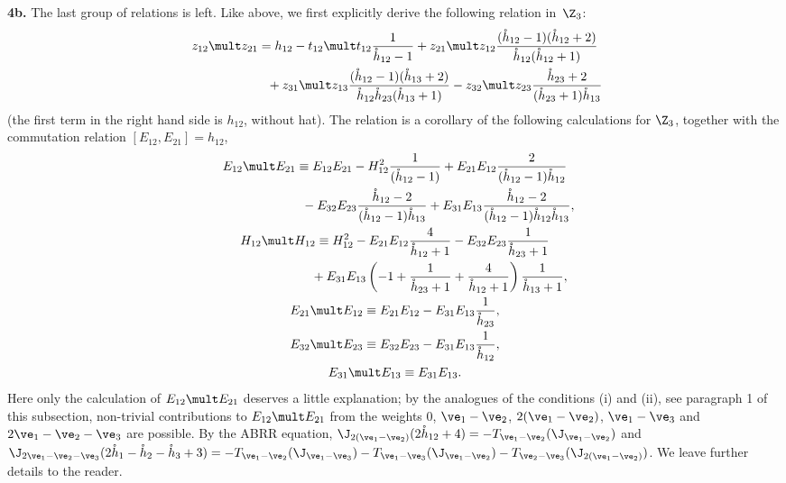 \documentclass[11pt]{article}
\def\nplus{\mathfrak{n}}\def\nn{\nonumber}\def\nin{\noindent}
\def\s{z}\def\S{\mathrm {S}}\def\si{\sigma}\def\Sp{\S^{\nplus}}\def\sy{\acute{\sigma}}\def\th{\mathring{h}}
\numberwithin{equation}{section}
\begin{document}
{\bf 4b.} The last group  of relations is left. Like above, we f\/irst explicitly derive the following relation in~$\Z_3$:
\begin{gather} \s_{12}\mult \s_{21}=  h_{12}-t_{12}\mult t_{12}  \frac{1}{\th_{12}-1}+\s_{21}\mult\s_{12}
\frac{(\th_{12}-1)(\th_{12} +2)}{\th_{12}(\th_{12} +1)}\nonumber\\
\phantom{\s_{12}\mult \s_{21}=}{} +  \s_{31}\mult\s_{13} \frac{(\th_{12}-1) (\th_{13} +2)}{\th_{12}\th_{23}(\th_{13}+1)}
-\s_{32}\mult\s_{23}  \frac{\th_{23} +2}{(\th_{23} +1)\th_{13}}  \label{re01}
\end{gather}
(the f\/irst term in the right hand side is $h_{12}$, without hat). The relation  is a corollary of the following calculations
for $\Z_3$, together with the commutation relation $[E_{12},E_{21}]=h_{12}$,
\begin{gather}E_{12}\mult E_{21}\equiv   E_{12}E_{21}-H_{12}^2 \frac{1}{(\th_{12}-1)}
+E_{21}E_{12} \frac{2}{(\th_{12}-1)\th_{12}}\nonumber\\
\phantom{E_{12}\mult E_{21}\equiv}{} - E_{32}E_{23} \frac{\th_{12} -2}{(\th_{12}-1)\th_{13}}+
E_{31}E_{13} \frac{\th_{12} -2}{(\th_{12}-1)\th_{12}\th_{13}} ,\label{zemod1}\\
 H_{12}\mult H_{12}\equiv   H_{12}^2-E_{21}E_{12} \frac{4}{\th_{12} +1}
-E_{32}E_{23} \frac{1}{\th_{23} +1}\nonumber\\
\phantom{H_{12}\mult H_{12}\equiv}{} +  E_{31}E_{13}\left(-1+\frac{1}{\th_{23} +1}+\frac{4}{\th_{12} +1}\right)\frac{1}{\th_{13}+1} ,\label{zemod2}\\
E_{21}\mult E_{12}\equiv E_{21}E_{12}-E_{31}E_{13} \frac{1}{\th_{23}} ,\label{zemod3}\\
 E_{32}\mult E_{23}\equiv  E_{32}E_{23}-E_{31}E_{13} \frac{1}{\th_{12}} ,\label{zemod4}\\
 E_{31}\mult E_{13}\equiv  E_{31}E_{13} .\label{zemod5}
 \end{gather}
Here only the calculation of $E_{12}\mult E_{21}$ deserves a little explanation; by  the analogues of the conditions (i) and (ii),
see paragraph 1 of this subsection, non-trivial contributions to $E_{12}\mult E_{21}$ from the weights 0,
$\ve_1-\ve_2$, $2(\ve_1-\ve_2)$, $\ve_1-\ve_3$ and $2\ve_1-\ve_2-\ve_3$ are possible. By the ABRR equation,
$\J_{2(\ve_1-\ve_2)}(2\th_{12}+4)=-T_{\ve_1-\ve_2}(\J_{\ve_1-\ve_2})$ and $\J_{2\ve_1-\ve_2-\ve_3}
(2\th_1-\th_2-\th_3+3)=-T_{\ve_1-\ve_2}(\J_{\ve_1-\ve_3})-T_{\ve_1-\ve_3}(\J_{\ve_1-\ve_2})-T_{\ve_2-\ve_3}
(\J_{2(\ve_1-\ve_2)})$. We leave further details to the reader.
\end{document}
